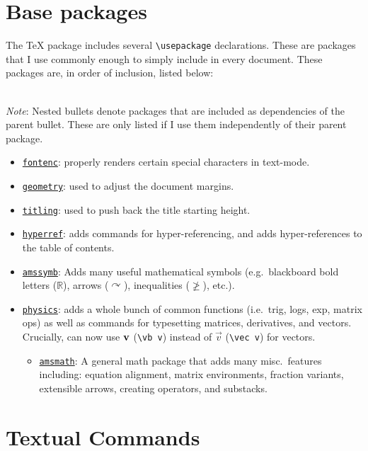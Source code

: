 \documentclass{article}
\begin{document}
\section{Base packages}
The \Ozaner\TeX{} package includes several \texttt{\textbackslash usepackage} declarations. These are packages that I use commonly enough to simply include in every document. These packages are, in order of inclusion, listed below:

\noindent\\\textit{Note}: Nested bullets denote packages that are included as dependencies of the parent bullet. These are only listed if I use them independently of their parent package.

\begin{itemize}
  \item \href{https://ctan.org/pkg/titling}{\texttt{fontenc}}: properly renders certain special characters in text-mode.
  \item \href{https://ctan.org/pkg/geometry}{\texttt{geometry}}: used to adjust the document margins.
  \item \href{https://ctan.org/pkg/titling}{\texttt{titling}}: used to push back the title starting height.
  \item \href{https://ctan.org/pkg/hyperref}{\texttt{hyperref}}: adds commands for hyper-referencing, and adds hyper-references to the table of contents.
  \item \href{https://ctan.org/pkg/amsfonts}{\texttt{amssymb}}: Adds many useful mathematical symbols (e.g.\ blackboard bold letters ($\mathbb{R}$), arrows ($\curvearrowright$), inequalities ($\ngeq$), etc.).
  \item \href{https://ctan.org/pkg/physics}{\texttt{physics}}: adds a whole bunch of common functions (i.e.\ trig, logs, exp, matrix ops) as well as commands for typesetting matrices, derivatives, and vectors. Crucially, can now use $\vb v$ (\texttt{\textbackslash vb v}) instead of $\vec v$ (\texttt{\textbackslash vec v}) for vectors.
  \begin{itemize}
    \item \href{https://ctan.org/pkg/amsmath}{\texttt{amsmath}}: A general math package that adds many misc.\ features including: equation alignment, matrix environments, fraction variants, extensible arrows, creating operators, and substacks.
  \end{itemize}
\end{itemize}

\section{Textual Commands}
\end{document}
